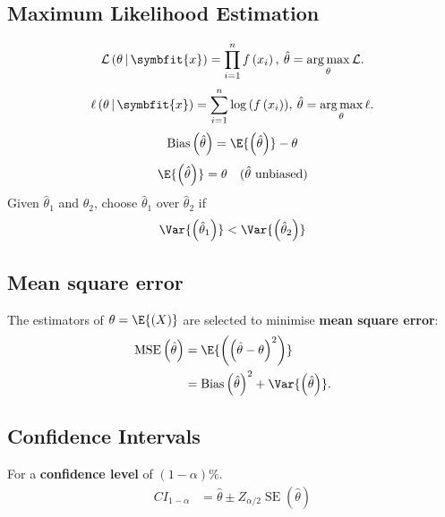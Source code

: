 \documentclass{article}
\DeclareMathOperator*{\argmax}{arg\,max}
\begin{document}
\begin{multicols}{3}
    \subsection{Maximum Likelihood Estimation}
    \begin{equation*}
        \mathcal{L}\left( \theta \,\vert\, \symbfit{x} \right) = \prod_{i = 1}^n f\left( x_i \right),\: \hat{\theta} = \argmax_\theta{\mathcal{L}}.
    \end{equation*}
    \begin{equation*}
        \ell\left( \theta \,\vert\, \symbfit{x} \right) = \sum_{i = 1}^n \log{\left( f\left( x_i \right) \right)},\: \hat{\theta} = \argmax_\theta{\ell}.
    \end{equation*}
    \begin{equation*}
        \operatorname{Bias}\left( \hat{\theta} \right) = \E{\left( \hat{\theta} \right)} - \theta
    \end{equation*}
    \begin{equation*}
        \E{\left( \hat{\theta} \right)} = \theta \quad \text{(\(\hat{\theta}\) unbiased)}
    \end{equation*}
    Given \(\hat{\theta}_1\) and \(\hat{\theta}_2\), choose \(\hat{\theta}_1\) over \(\hat{\theta}_2\) if
    \begin{equation*}
        \Var{\left( \hat{\theta}_1 \right)} < \Var{\left( \hat{\theta}_2 \right)}
    \end{equation*}
    \subsection{Mean square error}
    The estimators of \(\theta = \E{\left( X \right)}\)
    are selected to minimise \textbf{mean square error}:
    \begin{align*}
        \operatorname{MSE}\left( \hat{\theta} \right) & = \E{\left( \left( \hat{\theta} - \theta \right)^2 \right)}                             \\
                                                      & = \operatorname{Bias}\left( \hat{\theta} \right)^2 + \Var{\left( \hat{\theta} \right)}.
    \end{align*}
    \subsection{Confidence Intervals}
    For a \textbf{confidence level} of \(\left( 1 - \alpha \right)\%\).
    \begin{align*}
        {CI}_{1 - \alpha} & = \hat{\theta} \pm Z_{\alpha / 2} \operatorname{SE}\left( \hat{\theta} \right)
    \end{align*}

\end{multicols}
\end{document}
